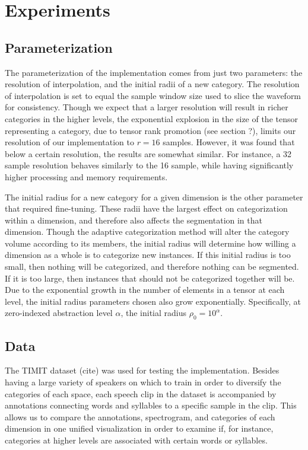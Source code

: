\documentclass[runningheads]{llncs}
\begin{document}
\section{Experiments}

\subsection{Parameterization}

The parameterization of the implementation comes from just two parameters: the resolution of interpolation, and the initial radii of a new category.  The resolution of interpolation is set to equal the sample window size used to slice the waveform for consistency.  Though we expect that a larger resolution will result in richer categories in the higher levels, the exponential explosion in the size of the tensor representing a category, due to tensor rank promotion (see section ?), limits our resolution of our implementation to $r=16$ samples.  However, it was found that below a certain resolution, the results are somewhat similar.  For instance, a 32 sample resolution behaves similarly to the 16 sample, while having significantly higher processing and memory requirements.

The initial radius for a new category for a given dimension is the other parameter that required fine-tuning.  These radii have the largest effect on categorization within a dimension, and therefore also affects the segmentation in that dimension.  Though the adaptive categorization method will alter the category volume according to its members, the initial radius will determine how willing a dimension as a whole is to categorize new instances.  If this initial radius is too small, then nothing will be categorized, and therefore nothing can be segmented.  If it is too large, then instances that should not be categorized together will be.  Due to the exponential growth in the number of elements in a tensor at each level, the initial radius parameters chosen also grow exponentially.  Specifically, at zero-indexed abstraction level $\alpha$, the initial radius $\rho_0 = 10^{\alpha}$.

\subsection{Data}

The TIMIT dataset (cite) was used for testing the implementation.  Besides having a large variety of speakers on which to train in order to diversify the categories of each space, each speech clip in the dataset is accompanied by annotations connecting words and syllables to a specific sample in the clip.  This allows us to compare the annotations, spectrogram, and categories of each dimension in one unified visualization in order to examine if, for instance, categories at higher levels are associated with certain words or syllables.
\end{document}
